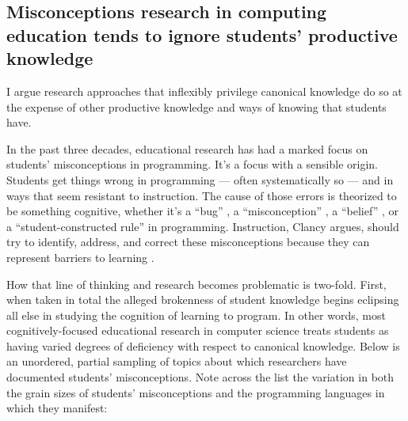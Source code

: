 \subsection{Misconceptions research in computing education tends to
ignore students' productive
knowledge}\label{misconceptions-research-in-computing-education-tends-to-ignore-students-productive-knowledge}

I argue research
approaches that inflexibly privilege canonical knowledge do so at the
expense of other productive knowledge and ways of knowing that students
have.

In the past three decades, educational research has had a marked focus
on students' misconceptions in programming. It's a focus with a sensible
origin. Students get things wrong in programming --- often
systematically so --- and in ways that seem resistant to instruction.
The cause of those errors is theorized to be something cognitive,
whether it's a ``bug'' \cite{pea_buggy_1987,pea_languageindependent_1986,vanlehn_mind_1990}, a
``misconception'' \cite{bayman_diagnosis_1983,bonar_preprogramming_1985,clancy_misconceptions_2004,gal-ezer_efficiency_2004,herman_proof_2008,kaczmarczyk_identifying_2010}, a ``belief'' \cite{fleury_student_1993}, or a ``student-constructed
rule'' \cite{fleury_parameter_1991,fleury_programming_2000} in programming. Instruction, Clancy argues, should try to identify,
address, and correct these misconceptions because they
can represent barriers to learning \cite{clancy_misconceptions_2004}.

How that line of thinking and research becomes problematic is two-fold.
First, when taken in total the alleged brokenness of student knowledge
begins eclipsing all else in studying the cognition of learning to
program. In other words, most cognitively-focused educational research
in computer science treats students as having varied degrees of
deficiency with respect to canonical knowledge. Below is an unordered,
partial sampling of topics about which researchers have documented
students' misconceptions. Note across the list the variation in both the
grain sizes of students' misconceptions and the programming languages in
which they manifest:

